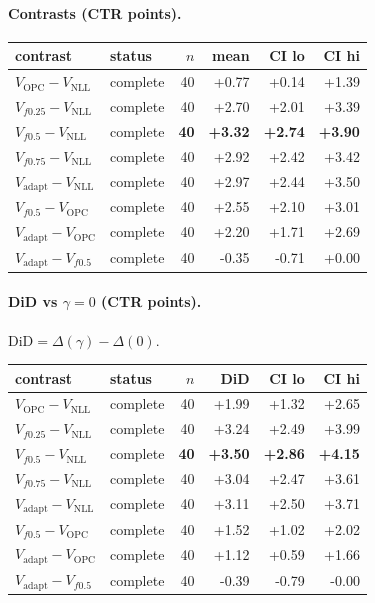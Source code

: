 \documentclass[10pt,a4paper]{article}
\begin{document}
\paragraph{Contrasts (CTR points).}
{\centering\small\begin{tabular}{llrrrr}
\toprule contrast & status & $n$ & mean & CI lo & CI hi \\
\midrule
$V_{\mathrm{OPC}}-V_{\mathrm{NLL}}$ & complete & 40 & +0.77 & +0.14 & +1.39 \\
$V_{f0.25}-V_{\mathrm{NLL}}$ & complete & 40 & +2.70 & +2.01 & +3.39 \\
\textbf{$V_{f0.5}-V_{\mathrm{NLL}}$} & complete & \textbf{40} & \textbf{+3.32} & \textbf{+2.74} & \textbf{+3.90} \\
$V_{f0.75}-V_{\mathrm{NLL}}$ & complete & 40 & +2.92 & +2.42 & +3.42 \\
$V_{\mathrm{adapt}}-V_{\mathrm{NLL}}$ & complete & 40 & +2.97 & +2.44 & +3.50 \\
$V_{f0.5}-V_{\mathrm{OPC}}$ & complete & 40 & +2.55 & +2.10 & +3.01 \\
$V_{\mathrm{adapt}}-V_{\mathrm{OPC}}$ & complete & 40 & +2.20 & +1.71 & +2.69 \\
$V_{\mathrm{adapt}}-V_{f0.5}$ & complete & 40 & -0.35 & -0.71 & +0.00 \\
\bottomrule\end{tabular}\par}
\paragraph{DiD vs $\gamma=0$ (CTR points).} $\mathrm{DiD}=\Delta(\gamma)-\Delta(0)$.
{\centering\small\begin{tabular}{llrrrr}
\toprule contrast & status & $n$ & DiD & CI lo & CI hi \\
\midrule
$V_{\mathrm{OPC}}-V_{\mathrm{NLL}}$ & complete & 40 & +1.99 & +1.32 & +2.65 \\
$V_{f0.25}-V_{\mathrm{NLL}}$ & complete & 40 & +3.24 & +2.49 & +3.99 \\
\textbf{$V_{f0.5}-V_{\mathrm{NLL}}$} & complete & \textbf{40} & \textbf{+3.50} & \textbf{+2.86} & \textbf{+4.15} \\
$V_{f0.75}-V_{\mathrm{NLL}}$ & complete & 40 & +3.04 & +2.47 & +3.61 \\
$V_{\mathrm{adapt}}-V_{\mathrm{NLL}}$ & complete & 40 & +3.11 & +2.50 & +3.71 \\
$V_{f0.5}-V_{\mathrm{OPC}}$ & complete & 40 & +1.52 & +1.02 & +2.02 \\
$V_{\mathrm{adapt}}-V_{\mathrm{OPC}}$ & complete & 40 & +1.12 & +0.59 & +1.66 \\
$V_{\mathrm{adapt}}-V_{f0.5}$ & complete & 40 & -0.39 & -0.79 & -0.00 \\
\bottomrule\end{tabular}\par}
\bigskip
\end{document}
